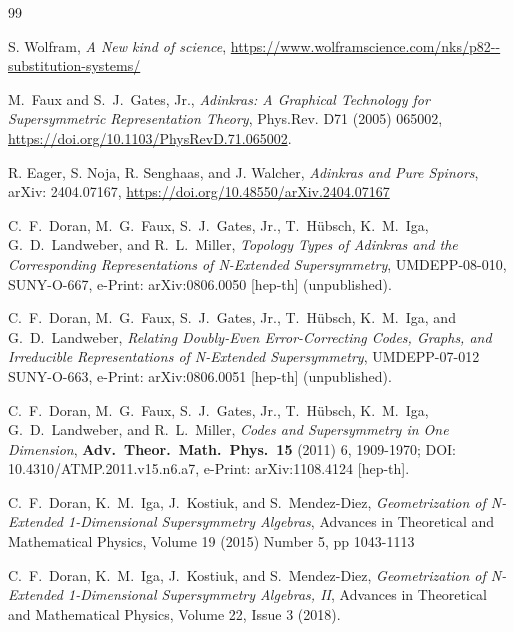 \documentclass[12pt]{article}
\makeatletter
\def\section{\@startsection{section}{1}{\z@}
        {3ex plus-1ex minus-.2ex}{1pt plus1pt}{\large\sf\bfseries\boldmath}}
\makeatother
\begin{document}
\newpage


\begin{thebibliography}{99}
\small\frenchspacing\raggedright
{}
{S. Wolfram}, {\em A New kind of science},
\url{https://www.wolframscience.com/nks/p82--substitution-systems/}

 M.\ Faux and S.\ J.\ Gates, Jr., 
{\em Adinkras: A Graphical Technology for Supersymmetric Representation Theory},
Phys.Rev. D71 (2005) 065002, 
\url{https://doi.org/10.1103/PhysRevD.71.065002}.

R. Eager, S. Noja, R. Senghaas, and J. Walcher, {\em Adinkras and Pure Spinors}, arXiv: 2404.07167,
\url{ 	
https://doi.org/10.48550/arXiv.2404.07167}

C.\ F.\ Doran, M.\ G.\ Faux, S.\ J.\ 
Gates, Jr., T.\ H\" ubsch, K.\ M.\ Iga, G.\ D.\ Landweber, and R.\ L.\ Miller, {\em Topology 
Types of Adinkras and the Corresponding Representations of N-Extended 
Supersymmetry},  UMDEPP-08-010, SUNY-O-667, e-Print: arXiv:0806.0050 [hep-th]
(unpublished).

C.\ F.\ Doran, M.\ G.\ Faux, S.\ J.\ Gates, Jr., T.\ H\" ubsch, K.\ M.\ Iga, and
G.\ D.\ Landweber,  {\em Relating Doubly-Even Error-Correcting Codes, Graphs, 
and Irreducible Representations of N-Extended Supersymmetry}, UMDEPP-07-012
SUNY-O-663, e-Print: arXiv:0806.0051 [hep-th] (unpublished).

C.\ F.\ Doran, M.\ G.\ Faux, S.\ J.\ Gates, Jr., T.\ H\" ubsch, K.\ M.\ Iga, G.\ D.\ 
Landweber, and R.\ L.\ Miller, {\em Codes and Supersymmetry in One Dimension},
{\bf {Adv.\ Theor.\ Math.\ Phys.\ {\bf {15}}}} (2011) 6, 1909-1970;  DOI: 10.4310/ATMP.2011.v15.n6.a7,
e-Print: arXiv:1108.4124 [hep-th].

C.\ F.\ Doran,  K.\ M.\ Iga, J.\ Kostiuk, and S.\ Mendez-Diez, {\em Geometrization of N-Extended 1-Dimensional Supersymmetry Algebras},  
Advances in Theoretical and Mathematical Physics, Volume 19 (2015) Number 5, pp 1043-1113

\bibitem{GEO2}
C.\ F.\ Doran,  K.\ M.\ Iga, J.\ Kostiuk, and S.\ Mendez-Diez, {\em Geometrization of N-Extended 1-Dimensional Supersymmetry Algebras, II},
Advances in Theoretical and Mathematical Physics, Volume 22, Issue 3 (2018).


\end{thebibliography}
\end{document}
